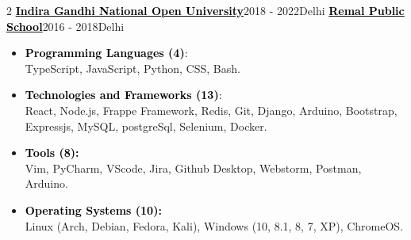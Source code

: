 \documentclass[10pt,a4paper,ragged2e,withhyper]{altacv}
\begin{document}
\begin{paracol}{2}
 {\href{https://www.ignou.ac.in/}{\textcolor{Black}{{\textbf{Indira Gandhi National Open University}}}}}{2018 - 2022}{Delhi}
	 {\href{https://www.remalpublicschool.in/}{\textcolor{Black}{{\textbf{Remal Public School}}}}}{2016 - 2018}{Delhi}

\vspace{-5pt}

\normalsize \begin{itemize}
	\item \textbf{\textcolor{black}{Programming Languages (4)}}: \\ TypeScript, JavaScript, Python, CSS, Bash.
	\vspace{3pt}
	\item \textbf{\textcolor{black}{Technologies and Frameworks (13)}}: \\ React, Node.js, Frappe Framework, Redis, Git, Django, Arduino, Bootstrap, Expressjs, MySQL, postgreSql, Selenium, Docker.
	\vspace{3pt}
%	
	
%	
	
	\item \textbf{\textcolor{Black}{Tools (8):}} \\ Vim, PyCharm, VScode, Jira, Github Desktop, Webstorm, Postman, Arduino.
	
	\vspace{3pt}
%
	
	\item \textbf{\textcolor{black}{Operating Systems (10):}} \\ Linux (Arch, Debian, Fedora, Kali), Windows (10, 8.1, 8, 7, XP), ChromeOS.
	
	\vspace{3pt}
%
	
	
	

\end{itemize}
\end{paracol}
\end{document}
